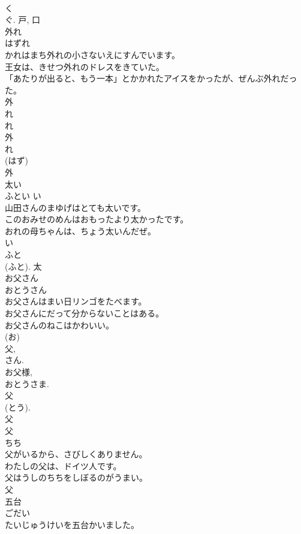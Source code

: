 \documentclass[8pt]{extreport}
\begin{document}
\begin{CJK}{UTF8}{min}
\\	く 
\\	ぐ.	戸, 口	
\\	外れ	
\\	はずれ	
\\	かれはまち外れの小さないえにすんでいます。	
\\	王女は、きせつ外れのドレスをきていた。	
\\	「あたりが出ると、もう一本」とかかれたアイスをかったが、ぜんぶ外れだった。	
\\	外 
\\	れ 
\\	れ
\\	外 
\\	れ 
\\	(はず) 
\\	外	
\\	太い	
\\	ふとい	い 
\\	山田さんのまゆげはとても太いです。	
\\	このおみせのめんはおもったより太かったです。	
\\	おれの母ちゃんは、ちょう太いんだぜ。	
\\	い 
\\	ふと 
\\	(ふと).	太	
\\	お父さん	
\\	おとうさん	
\\	お父さんはまい日リンゴをたべます。	
\\	お父さんにだって分からないことはある。	
\\	お父さんのねこはかわいい。	
\\	(お) 
\\	父, 
\\	さん. 
\\	お父様, 
\\	おとうさま. 
\\	父 
\\	(とう). 
\\	父	
\\	父	
\\	ちち	
\\	父がいるから、さびしくありません。	
\\	わたしの父は、ドイツ人です。	
\\	父はうしのちちをしぼるのがうまい。	
\\	父	
\\	五台	
\\	ごだい	
\\	たいじゅうけいを五台かいました。	

\end{CJK}
\end{document}
